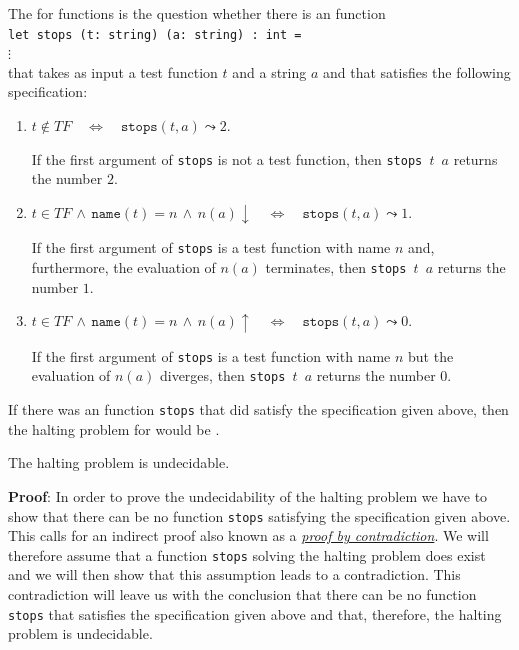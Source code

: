 \noindent
The   for \Fsharp{} functions is the question whether there is an
\Fsharp{} function \\[0.2cm]
\hspace*{1.3cm} \texttt{let stops (t: string) (a: string) : int =} \\
\hspace*{2.3cm} $\vdots$
\\[0.2cm] 
that takes as input a test function $t$ and a string $a$ and that satisfies the following specification:
\begin{enumerate}
\item $t \not\in T\!F \quad\Leftrightarrow\quad \mathtt{stops}(t, a) \leadsto 2$.

      If the first argument of \texttt{stops} is not a test function, then 
      \texttt{stops $t$ $a$} returns the number $2$.

\item $t \in T\!F \,\wedge\, \mathtt{name}(t) = n \,\wedge\, n(a)\downarrow \quad\Leftrightarrow\quad
       \mathtt{stops}(t, a) \leadsto 1$.

      If the first argument of \texttt{stops} is a test function with name $n$ and, furthermore,
      the evaluation of $n(a)$ terminates, then \texttt{stops $t$ $a$} returns the number $1$.

\item $t \in T\!F \,\wedge\, \mathtt{name}(t) = n \,\wedge\, n(a)\uparrow \quad\Leftrightarrow\quad
       \mathtt{stops}(t, a) \leadsto 0$.

      If the first argument of \texttt{stops} is a test function with name $n$ but the evaluation of $n(a)$ 
      diverges, then 
      \texttt{stops $t$ $a$} returns the number $0$.
\end{enumerate}
If there was an \Fsharp{} function \texttt{stops} that did satisfy the specification given above,
then the halting problem for \Fsharp{} would be .

\begin{Theorem}
  The halting problem is undecidable.
\end{Theorem}

\noindent
\textbf{Proof}:  In order to prove the undecidability of the halting problem we have to show that
there can be no function \texttt{stops} satisfying the specification given above.  This calls for an
indirect proof also known as a \href{http://en.wikipedia.org/wiki/Indirect_proof}{\emph{proof by contradiction}}.
We will therefore assume that a function \texttt{stops} solving the halting problem does
exist and we will then show that this assumption leads to a contradiction.  This contradiction will
leave us with the conclusion that there can be no function \texttt{stops} that satisfies
the specification given above and that, therefore, the halting problem is undecidable.


